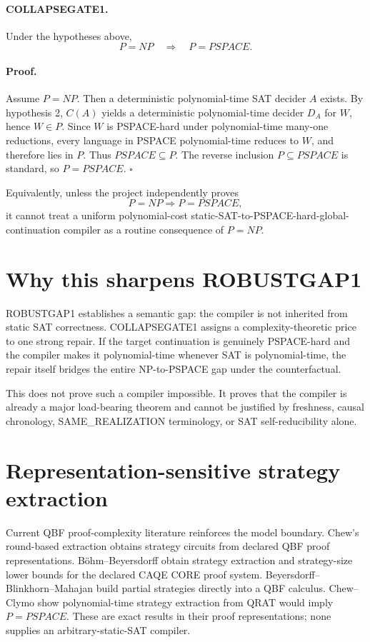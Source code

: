 \documentclass[11pt]{article}
\begin{document}
\paragraph{COLLAPSEGATE1.}
Under the hypotheses above,
\[
P=NP\quad\Longrightarrow\quad P=PSPACE.
\]

\paragraph{Proof.}
Assume \(P=NP\). Then a deterministic polynomial-time SAT decider \(A\) exists. By hypothesis 2, \(C(A)\) yields a deterministic polynomial-time decider \(D_A\) for \(W\), hence \(W\in P\). Since \(W\) is PSPACE-hard under polynomial-time many-one reductions, every language in PSPACE polynomial-time reduces to \(W\), and therefore lies in \(P\). Thus \(PSPACE\subseteq P\). The reverse inclusion \(P\subseteq PSPACE\) is standard, so \(P=PSPACE\). \(\square\)

Equivalently, unless the project independently proves
\[
P=NP\Longrightarrow P=PSPACE,
\]
it cannot treat a uniform polynomial-cost static-SAT-to-PSPACE-hard-global-continuation compiler as a routine consequence of \(P=NP\).

\section*{Why this sharpens ROBUSTGAP1}
ROBUSTGAP1 establishes a semantic gap: the compiler is not inherited from static SAT correctness. COLLAPSEGATE1 assigns a complexity-theoretic price to one strong repair. If the target continuation is genuinely PSPACE-hard and the compiler makes it polynomial-time whenever SAT is polynomial-time, the repair itself bridges the entire NP-to-PSPACE gap under the counterfactual.

This does not prove such a compiler impossible. It proves that the compiler is already a major load-bearing theorem and cannot be justified by freshness, causal chronology, SAME\_REALIZATION terminology, or SAT self-reducibility alone.

\section*{Representation-sensitive strategy extraction}
Current QBF proof-complexity literature reinforces the model boundary. Chew's round-based extraction obtains strategy circuits from declared QBF proof representations. Böhm--Beyersdorff obtain strategy extraction and strategy-size lower bounds for the declared CAQE CORE proof system. Beyersdorff--Blinkhorn--Mahajan build partial strategies directly into a QBF calculus. Chew--Clymo show polynomial-time strategy extraction from QRAT would imply \(P=PSPACE\). These are exact results in their proof representations; none supplies an arbitrary-static-SAT compiler.
\end{document}
